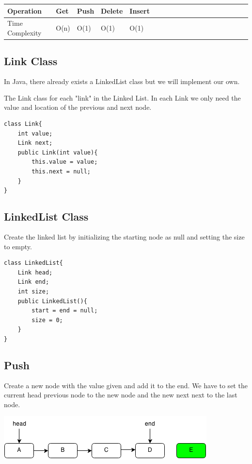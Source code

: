 \documentclass[11pt,oneside]{book}
\makeatletter
\def\maxwidth#1{\ifdim\Gin@nat@width>#1 #1\else\Gin@nat@width\fi}
\makeatother
\begin{document}
\vspace{10px}\begin{tabulary}{0.4\linewidth}{|l|l|l|l|l|l|l|l|l|l|l|l|l|l|l|l|l|l|l}\hline


  Operation &
  Get &
  Push &
  Delete &
  Insert\\
\hline


  Time Complexity &
  O(n) &
  O(1) &
  O(1) &
  O(1)\\

\hline\end{tabulary}

\subsection{Link Class}

In Java, there already exists a LinkedList class but we will implement our own.

The Link class for each "link" in the Linked List. In each Link we only need the value and location of the previous and next node.

\begin{lstlisting}
class Link{
    int value;
    Link next;
    public Link(int value){
        this.value = value;
        this.next = null;
    }
}
\end{lstlisting}

\subsection{LinkedList Class}

Create the linked list by initializing the starting node as null and setting the size to empty.

\begin{lstlisting}
class LinkedList{
    Link head;
    Link end;
    int size;
    public LinkedList(){
        start = end = null;
        size = 0;
    }
}
\end{lstlisting}

\subsection{Push}

Create a new node with the value given and add it to the end. We have to set the current head previous node to the new node and the new next next to the last node.

\vspace{5px}\includegraphics[width=\maxwidth{\textwidth}]{linkedlistpush.png}
\end{document}
